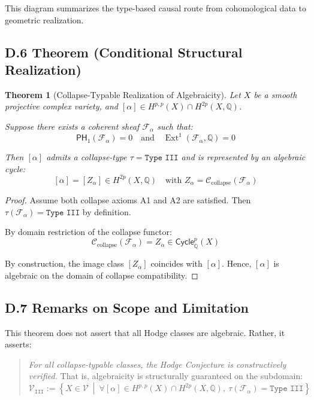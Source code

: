 \documentclass[11pt]{article}
\newtheorem{theorem}{Theorem}[section]
\DeclareMathOperator{\Ext}{Ext}
\begin{document}
This diagram summarizes the type-based causal route from cohomological data to geometric realization.

\subsection*{D.6 Theorem (Conditional Structural Realization)}

\begin{theorem}[Collapse-Typable Realization of Algebraicity]
Let $X$ be a smooth projective complex variety, and $[\alpha] \in H^{p,p}(X) \cap H^{2p}(X, \mathbb{Q})$.

Suppose there exists a coherent sheaf $\mathcal{F}_\alpha$ such that:
\[
\mathsf{PH}_1(\mathcal{F}_\alpha) = 0 \quad \text{and} \quad \Ext^1(\mathcal{F}_\alpha, \mathbb{Q}) = 0
\]

Then $[\alpha]$ admits a collapse-type $\tau = \texttt{Type III}$ and is represented by an algebraic cycle:
\[
[\alpha] = [Z_\alpha] \in H^{2p}(X, \mathbb{Q})
\quad \text{with } Z_\alpha = \mathcal{C}_{\text{collapse}}(\mathcal{F}_\alpha)
\]
\end{theorem}

\begin{proof}
Assume both collapse axioms A1 and A2 are satisfied.  
Then $\tau(\mathcal{F}_\alpha) = \texttt{Type III}$ by definition.

By domain restriction of the collapse functor:
\[
\mathcal{C}_{\text{collapse}}(\mathcal{F}_\alpha) = Z_\alpha \in \mathsf{Cycle}^p_\mathbb{Q}(X)
\]

By construction, the image class $[Z_\alpha]$ coincides with $[\alpha]$.  
Hence, $[\alpha]$ is algebraic on the domain of collapse compatibility.
\end{proof}

\subsection*{D.7 Remarks on Scope and Limitation}

This theorem does not assert that all Hodge classes are algebraic. Rather, it asserts:

\begin{quote}
\emph{For all collapse-typable classes, the Hodge Conjecture is constructively verified.}  
That is, algebraicity is structurally guaranteed on the subdomain:
\[
\mathcal{V}_{\texttt{III}} := \left\{ X \in \mathcal{V} \ \middle| \ 
\forall [\alpha] \in H^{p,p}(X) \cap H^{2p}(X, \mathbb{Q}),\ 
\tau(\mathcal{F}_\alpha) = \texttt{Type III} \right\}
\]
\end{quote}
\end{document}
